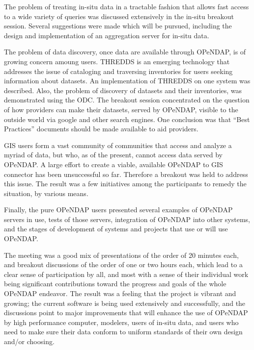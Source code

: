 The problem of treating in-situ data in a tractable fashion that allows
fast access to a wide variety of queries was discussed extensively
in the in-situ breakout session.  Several suggestions were made which
will be pursued, including the design and implementation of an
aggregation server for in-situ data.

The problem of data discovery, once data are available through
\ac{OPeNDAP}, is of growing concern amoung users.  \ac{THREDDS}
is an emerging technology that addresses the issue of 
cataloging and traversing inventories for users seeking information
about datasets.  An implementation of \ac{THREDDS} on one system
was described.  Also, the problem of discovery of datasets and
their inventories, was demonstrated using the \ac{ODC}.  The breakout
session concentrated on the question of how providers can make
their datasets, served by \ac{OPeNDAP}, visible to the outside
world via google and other search engines.  One conclusion was
that ``Best Practices'' documents should be made available to aid
providers.

\ac{GIS} users form a vast community of communities that access
and analyze a myriad of data, but who, as of the present,
cannot access data served by \ac{OPeNDAP}.  A large effort
to create a viable, available \ac{OPeNDAP} to \ac{GIS}
connector has been unsuccessful so far.  Therefore a breakout
was held to address this issue.  The result was a few
initiatives among the participants to remedy the situation,
by various means.

Finally, the pure \ac{OPeNDAP} users presented several examples
of \ac{OPeNDAP} servers in use, tests of those servers, 
integration of \ac{OPeNDAP} into other systems, and the stages
of development of systems and projects that use or will use
\ac{OPeNDAP}.

The meeting was a good mix of presentations of the order of
20 minutes each, and breakout discussions of the order of one
or two hours each, which lead to a clear sense of participation
by all, and most with a sense of their individual work being 
significant contributions toward the progress and goals of the
whole \ac{OPeNDAP} endeavor.  The result was a feeling that the
project is vibrant and growing;  the current software is being
used extensively and successfully, and the discussions point
to major improvements that will enhance the use of \ac{OPeNDAP}
by high performance computer, modelers, users of in-situ data,
and users who need to make sure their data conform to uniform
standards of their own design and/or choosing.

%
%
%
%

